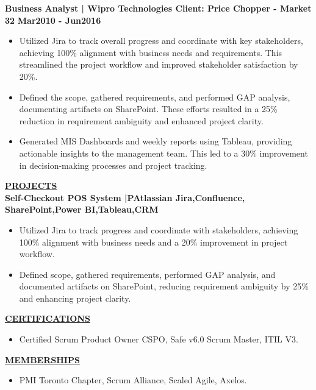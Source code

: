 \documentclass{article}
\begin{document}
\noindent \textbf{Business Analyst | Wipro Technologies Client: Price Chopper - Market 32}  \hfill \textbf{Mar2010 - Jun2016}
\begin{itemize}[noitemsep,nolistsep,leftmargin=*]
\item {\small Utilized Jira to track overall progress and coordinate with key stakeholders, achieving 100\% alignment with business needs and requirements. This streamlined the project workflow and improved stakeholder satisfaction by 20\%.}
\item {\small Defined the scope, gathered requirements, and performed GAP analysis, documenting artifacts on SharePoint. These efforts resulted in a 25\% reduction in requirement ambiguity and enhanced project clarity.}
\item {\small Generated MIS Dashboards and weekly reports using Tableau, providing actionable insights to the management team. This led to a 30\% improvement in decision-making processes and project tracking.}
\end{itemize}

\vspace{2mm}

\noindent \textbf{\underline{PROJECTS}} \\
\textbf{\textbf{Self-Checkout POS System }|PAtlassian Jira,Confluence, SharePoint,Power BI,Tableau,CRM} 
\begin{itemize}[noitemsep,nolistsep,leftmargin=*]
    \item Utilized Jira to track progress and coordinate with stakeholders, achieving 100\% alignment with business needs and a 20\% improvement in project workflow.
    \item Defined scope, gathered requirements, performed GAP analysis, and documented artifacts on SharePoint, reducing requirement ambiguity by 25\% and enhancing project clarity.


\end{itemize}

\vspace{2mm}
\noindent \textbf{\underline{CERTIFICATIONS}}
\begin{itemize}[noitemsep,nolistsep,leftmargin=*]
    \item Certified Scrum Product Owner CSPO, Safe v6.0 Scrum Master, ITIL V3.
\end{itemize}

\vspace{2mm}
\noindent \textbf{ \underline {MEMBERSHIPS}}
\begin{itemize}[noitemsep,nolistsep,leftmargin=*]
    \item PMI Toronto Chapter, Scrum Alliance, Scaled Agile, Axelos.
\end{itemize}
\end{document}
